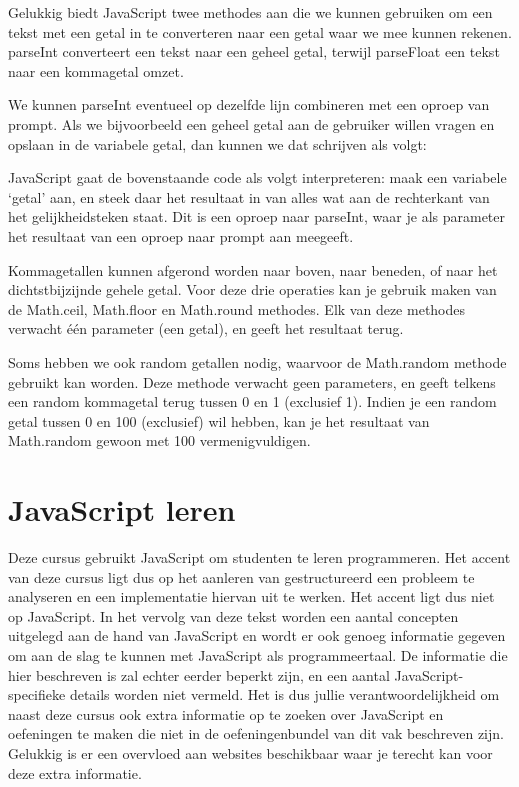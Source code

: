 Gelukkig biedt JavaScript twee methodes aan die we kunnen gebruiken om een tekst met een getal in te converteren naar een getal waar we mee kunnen rekenen. parseInt converteert een tekst naar een geheel getal, terwijl parseFloat een tekst naar een kommagetal omzet.


We kunnen parseInt eventueel op dezelfde lijn combineren met een oproep van prompt. Als we bijvoorbeeld een geheel getal aan de gebruiker willen vragen en opslaan in de variabele getal, dan kunnen we dat schrijven als volgt:


JavaScript gaat de bovenstaande code als volgt interpreteren: maak een variabele `getal' aan, en steek daar het resultaat in van alles wat aan de rechterkant van het gelijkheidsteken staat. Dit is een oproep naar parseInt, waar je als parameter het resultaat van een oproep naar prompt aan meegeeft.

Kommagetallen kunnen afgerond worden naar boven, naar beneden, of naar het dichtstbijzijnde gehele getal. Voor deze drie operaties kan je gebruik maken van de Math.ceil, Math.floor en Math.round methodes. Elk van deze methodes verwacht \'e\'en parameter (een getal), en geeft het resultaat terug.

Soms hebben we ook random getallen nodig, waarvoor de Math.random methode gebruikt kan worden. Deze methode verwacht geen parameters, en geeft telkens een random kommagetal terug tussen 0 en 1 (exclusief 1). Indien je een random getal tussen 0 en 100 (exclusief) wil hebben, kan je het resultaat van Math.random gewoon met 100 vermenigvuldigen.

\section{JavaScript leren}

Deze cursus gebruikt JavaScript om studenten te leren programmeren. Het accent van deze cursus ligt dus op het aanleren van gestructureerd een probleem te analyseren en een implementatie hiervan uit te werken. Het accent ligt dus niet op JavaScript. In het vervolg van deze tekst worden een aantal concepten uitgelegd aan de hand van JavaScript en wordt er ook genoeg informatie gegeven om aan de slag te kunnen met JavaScript als programmeertaal. De informatie die hier beschreven is zal echter eerder beperkt zijn, en een aantal JavaScript-specifieke details worden niet vermeld. Het is dus jullie verantwoordelijkheid om naast deze cursus ook extra informatie op te zoeken over JavaScript en oefeningen te maken die niet in de oefeningenbundel van dit vak beschreven zijn. Gelukkig is er een overvloed aan websites beschikbaar waar je terecht kan voor deze extra informatie.

